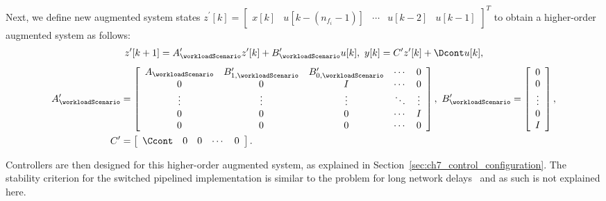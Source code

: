 Next, we define new augmented system states $z^{\prime}[k]=\left[ \begin{array}{ccccc} x[k] &  u[k-(n_{f_i}-1)] & \cdots & u[k-2] & u[k-1] \end{array} \right]^T$ to obtain a higher-order augmented system as follows:
\begin{equation}
\label{eq:ch7_cld2_pipe}
z^{\prime}[k+1] = A_{\workloadScenario}^{\prime}z^{\prime}[k] + B_{\workloadScenario}^{\prime}u[k],\ 
y[k]=C^{\prime}z^{\prime}[k] + \Dcont u[k], \nonumber
\end{equation}
\begin{align}
A_{\workloadScenario}^{\prime} &= \left[ \begin{array}{ccccc} A_{\workloadScenario} &  B_{1,\workloadScenario}^{\prime} & B_{0,\workloadScenario}^{\prime} & \cdots & 0 \\  0 & 0 & I & \cdots & 0\\
\vdots & \vdots & \vdots & \ddots & \vdots\\
0 & 0 & 0 & \cdots & I\\
0 & 0 & 0 & \cdots & 0\\
\end{array} \right],\ 
B_{\workloadScenario}^{\prime} = \left[ \begin{array}{c} 0 \\ 0 \\ \vdots \\ 0 \\  I \end{array} \right],\nonumber\\
C^{\prime}&= \left[ \begin{array}{ccccc} \Ccont &  0 & 0 & \cdots & 0\end{array} \right].   
\label{eq:ch7_aug_pipe}
\end{align}

Controllers are then designed for this higher-order augmented system, as explained in Section~\ref{sec:ch7_control_configuration}.
The stability criterion for the switched pipelined implementation is similar to the problem for long network delays~\cite{lincoln2000optimal,cloosterman2009stability} and as such is not explained here.

